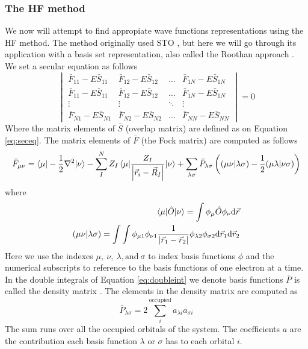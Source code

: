 \documentclass[../master_thesis.tex]{subfiles}
\begin{document}
\subsubsection{The \ac{HF} method}
We now will attempt to find appropiate wave functions representations using the \ac{HF} method.
The method originally used \ac{STO} \cite{Cramer:2004}, but here we will
go through its application with a basis set representation, also called the Roothan approach
\cite{Cramer:2004, Helgaker:2012}.
We set a secular equation as follows
\begin{equation}\label{eq:fockseceq}
  \begin{vmatrix}
    \bar{F}_{11} - E\bar{S}_{11} & \bar{F}_{12} - E\bar{S}_{12} & \ldots & \bar{F}_{1N} - E\bar{S}_{1N} \\
    \bar{F}_{11} - E\bar{S}_{11} & \bar{F}_{12} - E\bar{S}_{12} & \ldots & \bar{F}_{1N} - E\bar{S}_{1N} \\
    \vdots & \vdots & \ddots & \vdots\\
    \bar{F}_{N1} - E\bar{S}_{N1} & \bar{F}_{N2} - E\bar{S}_{N2} & \ldots & \bar{F}_{NN} - E\bar{S}_{NN}
  \end{vmatrix} = 0
\end{equation}
Where the matrix elements of $\bar{S}$ (overlap matrix) are defined as on Equation
\ref{eq:seceq}. The matrix elements of $\bar{F}$ (the Fock matrix) are computed
as follows \cite{Cramer:2004}
\begin{equation}\label{eq:Fockmatrix}
  \bar{F}_{\mu\nu} = \braket{\mu|-\frac{1}{2}\nabla^2|\nu}
  - \sum^N_IZ_I\braket{\mu|\frac{Z_I}{\abs{\vec{r}_i
  - \vec{R}_I}}|\nu} + \sum_{\lambda\sigma} \bar{P}_{\lambda \sigma}\left( (\mu\nu|\lambda\sigma) - \frac{1}{2}(\mu\lambda|\nu\sigma) \right)
\end{equation}
where
\begin{align}\label{eq:doubleint}
  \braket{\mu|\hat{O}| \nu} = \int\phi_{\mu}\hat{O}\phi_{\nu}\text{d}\vec{r}\\
  (\mu\nu|\lambda\sigma) = \int\int\phi_{\mu1}\phi_{\nu1}\frac{1}{\abs{\vec{r}_1 - \vec{r}_2}}\phi_{\lambda2}\phi_{\sigma2} \text{d}\vec{r}_1\text{d}\vec{r}_2
\end{align}
Here we use the indexes $\mu,\ \nu,\ \lambda, \text{and}\ \sigma$ to index basis
functions $\phi$ and the numerical subscripts to reference to the basis functions
of one electron at a time.
In the double integrals of Equation \ref{eq:doubleint} we denote basis functions
$\bar{P}$ is called the density matrix \cite{Cramer:2004}. The elements in the
density matrix are computed as \cite{Cramer:2004}
\begin{equation}
  \bar{P}_{\lambda\sigma} = 2 \sum_i^{\text{occupied}}a_{\lambda i}a_{\sigma i}
\end{equation}
The sum runs over all the occupied orbitals of the system. The coefficients $a$
are the contribution each basis function $\lambda$ or $\sigma$ has to each orbital $i$.
\end{document}
